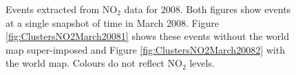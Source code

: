 \documentclass[a4paper,11pt]{article}
\begin{document}
\begin{figure}[H]
	\centering
	\caption{\footnotesize Events extracted from $\text{NO}_2$ data for 2008. Both figures show events at a single snapshot of time in March 2008. Figure \ref{fig:ClustersNO2March20081} shows these events without the world map super-imposed and Figure \ref{fig:ClustersNO2March20082} with the world map. Colours do not reflect $\text{NO}_2$ levels. }
	\label{fig:ClustersNO2March2008}
\end{figure}
\end{document}
